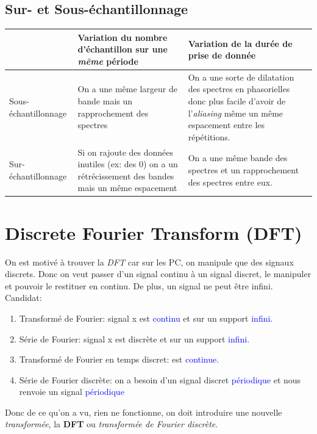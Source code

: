 \documentclass{report}
\begin{document}
\section{Sur- et Sous-échantillonnage}
\begin{tabular}{| m{3cm} | m{5cm} | m{5cm} |}
\hline
\cellcolor[rgb]{0.8, 0.8, 0.8} & \cellcolor[rgb]{0.8, 0.8, 0.8} Variation du nombre d'échantillon sur une \textit{même} période & \cellcolor[rgb]{0.8, 0.8, 0.8} Variation de la durée de prise de donnée\\
\hline
\cellcolor[rgb]{0.8, 0.8, 0.8} Sous-échantillonnage & On a une même largeur de bande mais un rapprochement des spectres & On a une sorte de dilatation des spectres en phasorielles donc plus facile d'avoir de l'\textit{aliasing} même un même espacement entre les répétitions.\\ 
\hline
\cellcolor[rgb]{0.8, 0.8, 0.8} Sur-échantillonnage & Si on rajoute des données inutiles (ex: des 0) on a un rétrécissement des bandes mais un même espacement & On a une même bande des spectres et un rapprochement des spectres entre eux. \\
\hline
\end{tabular}

\chapter{Discrete Fourier Transform (DFT)} 
On est motivé à trouver la \textit{DFT} car sur les PC, on manipule que des signaux discrets. Donc on veut passer d'un signal continu à un signal discret, le manipuler et pouvoir le restituer en continu. De plus, un signal ne peut être infini.\\
Candidat:
\begin{enumerate}
\item Transformé de Fourier: signal x est \textcolor{blue}{continu} et sur un support \textcolor{blue}{infini}.
\item Série de Fourier: signal x est discrète et sur un support \textcolor{blue}{infini}.
\item Transformé de Fourier en temps discret: est \textcolor{blue}{continue}.
\item Série de Fourier discrète: on a besoin d'un signal discret \textcolor{blue}{périodique} et nous renvoie un signal \textcolor{blue}{périodique}
\end{enumerate}
Donc de ce qu'on a vu, rien ne fonctionne, on doit introduire une nouvelle \textit{transformée}, la \textbf{DFT} ou \textit{transformée de Fourier discrète}.
\end{document}
